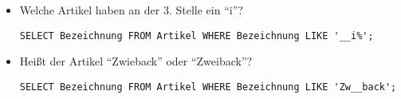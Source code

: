 \documentclass{bschlangaul-aufgabe}
\begin{document}
\begin{enumerate}
\begin{itemize}

\item Welche Artikel haben an der 3. Stelle ein “i”?

\begin{bAntwort}
\begin{verbatim}
SELECT Bezeichnung FROM Artikel WHERE Bezeichnung LIKE '__i%';
\end{verbatim}
\end{bAntwort}


\item Heißt der Artikel “Zwieback” oder “Zweiback”?

\begin{bAntwort}
\begin{verbatim}
SELECT Bezeichnung FROM Artikel WHERE Bezeichnung LIKE 'Zw__back';
\end{verbatim}
\end{bAntwort}
\end{itemize}
\end{enumerate}

%

\end{document}
